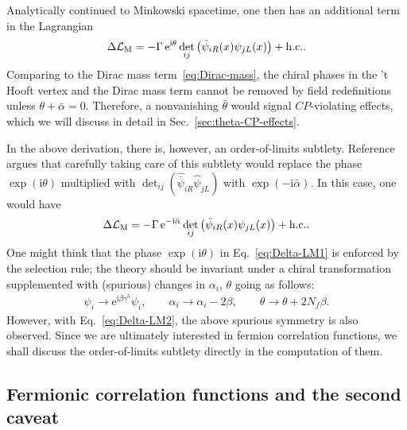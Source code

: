 \documentclass[review]{elsarticle}
\numberwithin{equation}{section}
\numberwithin{table}{section}
\numberwithin{figure}{section}
\def\L{\mathcal{L}}
\def\i{\mathrm{i}}
\def\e{\mathrm{e}}
\def\hc{{\rm h.c.}}
\begin{document}
Analytically continued to Minkowski spacetime, one then has an additional term in the Lagrangian
\begin{align}
    \Delta\L_{\rm M} = -\Gamma\,\e^{\i\theta}\det_{ij}\left({\bar{\psi}}_{iR}(x) {\psi}_{jL}(x)\right)  + \hc .
    \label{eq:Delta-LM1}
\end{align}
Comparing to the Dirac mass term~\eqref{eq:Dirac-mass}, the chiral phases in the 't Hooft vertex and the Dirac mass term cannot be removed by field redefinitions unless $\theta+\bar\alpha=0$. Therefore, a nonvanishing $\bar\theta$ would signal $CP$-violating effects, which we will discuss in detail in Sec.~\ref{sec:theta-CP-effects}.

In the above derivation, there is, however, an order-of-limits subtlety. Reference~\cite{Ai:2020ptm} argues that carefully taking care of this subtlety would replace the phase $\exp(\i\theta)$ multiplied with $\det_{ij}\left(\hat{\bar\psi}_{iR}\hat\psi_{jL}\right)$ with $\exp(-\i\bar\alpha)$. In this case, one would have 
\begin{align}
    \Delta\L_{\rm M} = -\Gamma\,\e^{-\i\bar\alpha} \det_{ij}\left({\bar{\psi}}_{iR}(x){\psi}_{jL}(x)\right)  + \hc .
    \label{eq:Delta-LM2}
\end{align}
One might think that the phase $\exp(\i\theta)$ in Eq.~\eqref{eq:Delta-LM1} is enforced by the selection rule; the theory should be invariant under a chiral transformation supplemented with (spurious) changes in $\alpha_i$, $\theta$ going as follows:
\begin{align}
    {\psi}_i\to \e^{\i\beta\gamma^5}{\psi}_i,\qquad \alpha_i\to \alpha_i-2\beta,\qquad \theta\to \theta+2 N_f\beta.
\end{align}
However, with Eq.~\eqref{eq:Delta-LM2}, the above spurious symmetry is also observed. Since we are ultimately interested in fermion correlation functions, we shall discuss the order-of-limits subtlety directly in the computation of them.

\subsection{Fermionic correlation functions and the second caveat}
\label{sec:diga}
\end{document}
